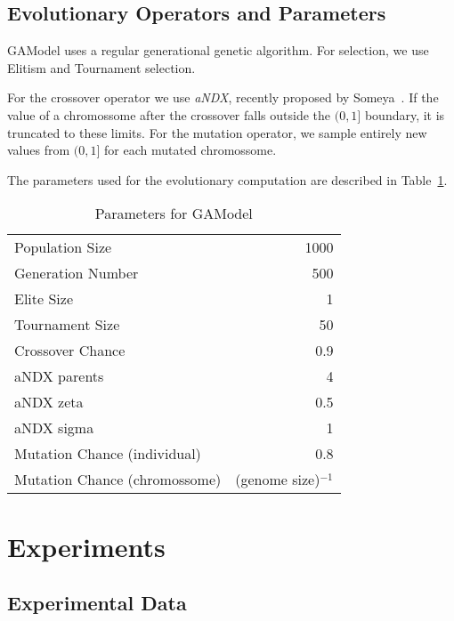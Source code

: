 \documentclass{sig-alternate}
\begin{document}
\subsection{Evolutionary Operators and Parameters}

GAModel uses a regular generational genetic algorithm. For selection,
we use Elitism and Tournament selection. 

For the crossover operator we use \emph{aNDX}, recently proposed by
Someya~\cite{Someya2013}. If the value of a chromossome after the
crossover falls outside the $(0,1]$ boundary, it is truncated to these
  limits. For the mutation operator, we sample entirely new values
  from $(0,1]$ for each mutated chromossome.

The parameters used for the evolutionary computation are described in
Table~\ref{GAParameters}. %

\begin{table}[!h]
  \caption{Parameters for GAModel}
  \label{GAParameters}
  \begin{center}
  \begin{tabular}{|l|r|}
    \hline
    Population Size & 1000\\
    Generation Number & 500\\
    Elite Size & 1\\
    Tournament Size & 50\\
    Crossover Chance & 0.9\\
    aNDX parents & 4\\
    aNDX zeta & 0.5\\
    aNDX sigma & 1\\
    Mutation Chance (individual) & 0.8\\
    Mutation Chance (chromossome) & (genome size)$^{-1}$\\
    \hline    
  \end{tabular}
  \end{center}
\end{table}


\section{Experiments}

\subsection{Experimental Data}
\end{document}
